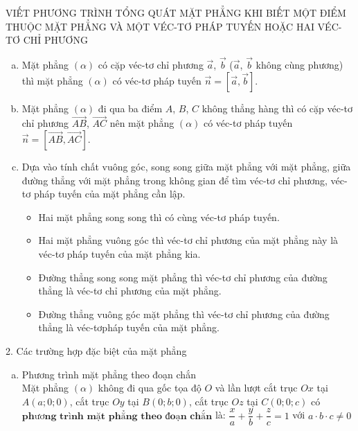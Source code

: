 \begin{dang}{VIẾT PHƯƠNG TRÌNH TỔNG QUÁT MẶT PHẲNG KHI BIẾT MỘT ĐIỂM THUỘC MẶT PHẲNG VÀ MỘT VÉC-TƠ PHÁP TUYẾN HOẶC HAI VÉC-TƠ CHỈ PHƯƠNG}
\begin{enumerate}[a.]
\item Mặt phẳng $\left(\alpha\right)$ có cặp véc-tơ chỉ phương $\overrightarrow{a}$, $\overrightarrow{b}$ ($\overrightarrow{a}$, $\overrightarrow{b}$ không cùng phương) thì mặt phẳng $\left(\alpha\right)$ có véc-tơ pháp tuyến $\overrightarrow{n}= \left[\overrightarrow{a},\overrightarrow{b}\right]$.
\item Mặt phẳng $\left(\alpha\right)$ đi qua ba điểm $A$, $B$, $C$ không thẳng hàng thì có cặp véc-tơ chỉ phương $\overrightarrow{AB}$, $\overrightarrow{AC}$ nên mặt phẳng $\left(\alpha\right)$ có véc-tơ pháp tuyến $\overrightarrow{n} = \left[\overrightarrow{AB}, \overrightarrow{AC}\right]$.
\item Dựa vào tính chất vuông góc, song song giữa mặt phẳng với mặt phẳng, giữa đường thẳng với mặt phẳng trong không gian để tìm véc-tơ chỉ phương, véc-tơ pháp tuyến của mặt phẳng cần lập.
\begin{itemize}
\item Hai mặt phẳng song song thì có cùng véc-tơ pháp tuyến.
\item Hai mặt phẳng vuông góc thì véc-tơ chỉ phương của mặt phẳng này là véc-tơ pháp tuyến của mặt phẳng kia.
\item Đường thẳng song song mặt phẳng thì véc-tơ chỉ phương của đường thẳng là véc-tơ chỉ phương của mặt phẳng.
\item Đường thẳng vuông góc mặt phẳng thì véc-tơ chỉ phương của đường thẳng là véc-tơpháp tuyến của mặt phẳng.
\end{itemize}
\end{enumerate}
2. Các trường hợp đặc biệt của mặt phẳng
\begin{enumerate}[a.]
\item Phương trình mặt phẳng theo đoạn chắn\\
Mặt phẳng $\left(\alpha\right)$ không đi qua gốc tọa độ $O$ và lần lượt cắt trục $Ox$ tại $A \left(a;0;0\right)$, cắt trục $Oy$ tại $B \left(0;b;0\right)$, cắt trục $Oz$ tại $C \left(0;0;c\right)$ có $\textbf{phương trình mặt phẳng theo đoạn chắn}$ là: $\dfrac{x}{a}+\dfrac{y}{b}+\dfrac{z}{c}=1$ với $a \cdot b \cdot c \neq 0$
\begin{center}
\end{center}
\end{enumerate}
\end{dang}
